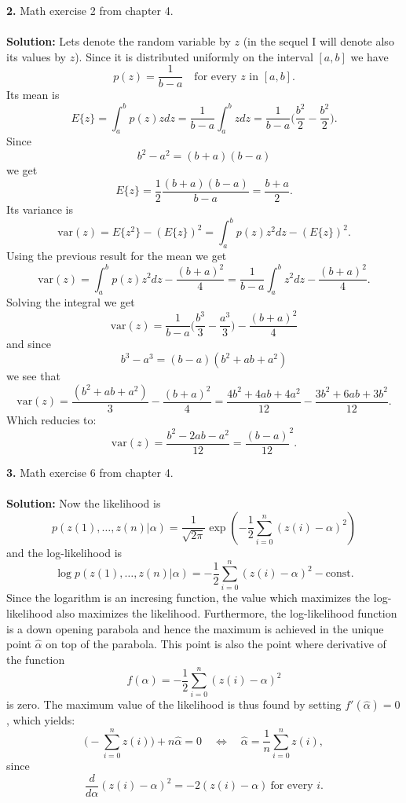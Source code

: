 \documentclass[10pt,a4paper]{amsart}
\newenvironment{tehtratk}%
             {\begin{list}{\arabic{enumi}.}{\usecounter{enumi}%
              \setlength{\labelsep}{0.5em}%
              \settowidth{\labelwidth}{\arabic{enumi}.}%
              \setlength{\leftmargin}{\labelwidth+\labelsep}}}%
             {\end{list}}
\begin{document}
\begin{tehtratk}
\item[\textbf{2.}] Math exercise 2 from chapter 4.\\
\\
\textbf{Solution:} Lets denote the random variable by $z$ (in the sequel I will
denote also its values by $z$). Since it is distributed uniformly on the
interval $[a, b]$ we have
\[
p(z) = \frac{1}{b - a} \quad \text{for every $z$ in $[a, b]$}.
\]
Its mean is
\[
E\{z\} = \int_a^b p(z)zdz = \frac{1}{b - a}\int_a^b zdz =
\frac{1}{b - a}\Big(\frac{b^2}{2} - \frac{b^2}{2}\Big).
\]
Since
\[
b^2 - a^2 = (b + a)(b - a)
\]
we get
\[
E\{z\} =
\frac{1}{2}\frac{(b + a)(b - a)}{b - a} = \frac{b + a}{2}.
\]
Its variance is
\[
\text{var}(z) = E\{z^2\} - (E\{z\})^2 = \int_a^b p(z)z^2dz  - (E\{z\})^2.
\]
Using the previous result for the mean we get
\[
\text{var}(z) = \int_a^b p(z)z^2dz  - \frac{(b + a)^2}{4} =
\frac{1}{b - a}\int_a^b z^2dz - \frac{(b + a)^2}{4}.
\]
Solving the integral we get
\[
\text{var}(z) =
\frac{1}{b - a}\Big(\frac{b^3}{3} - \frac{a^3}{3}\Big)- \frac{(b + a)^2}{4}
\]
and since
\[
b^3 - a^3 = (b -a)(b^2 + ab + a^2)
\]
we see that
\[
\text{var}(z) = \frac{(b^2 + ab + a^2)}{3} - \frac{(b + a)^2}{4}
= \frac{4b^2 + 4ab + 4a^2}{12} -\frac{3b^2 + 6ab + 3b^2}{12}.\]
Which reducies to:
\[
\text{var}(z) = \frac{b^2 - 2ab - a^2}{12} = \frac{(b - a)}{12}^2.
\]
\vspace{0.3cm}
\item[\textbf{3.}] Math exercise 6 from chapter 4.\\
\\
\textbf{Solution:} Now the likelihood is
\[
p(z(1), \ldots , z(n)|\alpha) =
\frac{1}{\sqrt{2 \pi}}\exp(-\frac{1}{2}\sum_{i = 0}^n(z(i) - \alpha)^2)
\]
and the log-likelihood is
\[
\log p(z(1), \ldots , z(n)|\alpha) =
-\frac{1}{2}\sum_{i = 0}^n(z(i) - \alpha)^2 - \text{const.}
\]
Since the logarithm is an incresing function, the value which maximizes the
log-likelihood also maximizes the likelihood. Furthermore, the log-likelihood
function is a down opening parabola and hence the maximum is achieved in the
unique point $\hat{\alpha}$ on top of the parabola. This point is also the point
where derivative of the function
\[f(\alpha) = -\frac{1}{2}\sum_{i = 0}^n(z(i) - \alpha)^2\]
is zero.
The maximum value of the likelihood is thus found by setting
$f'(\hat{\alpha}) = 0$, which yields:
\[
\big(-\sum_{i = 0}^n z(i)\big) + n\hat{\alpha} = 0
\quad \Leftrightarrow \quad \hat{\alpha} = \frac{1}{n}\sum_{i = 0}^n z(i),
\]
since
\[
\frac{d}{d\alpha}(z(i) - \alpha)^2 = -2(z(i) -\alpha) \ \text{for every $i$.}
\]
\end{tehtratk}
\end{document}
